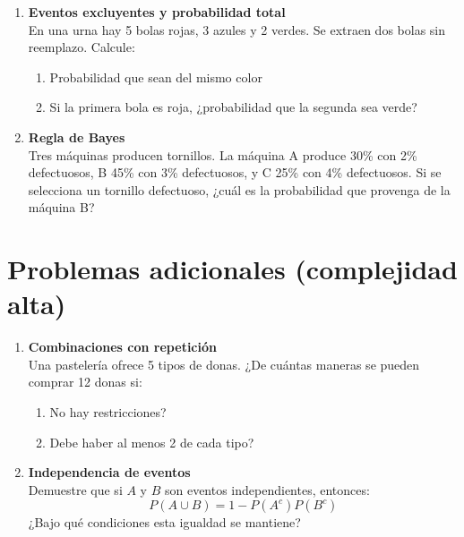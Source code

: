 \documentclass[letterpaper]{article}
\begin{document}
\begin{enumerate}
		\item \textbf{Eventos excluyentes y probabilidad total}\\
		En una urna hay 5 bolas rojas, 3 azules y 2 verdes. Se extraen dos bolas sin reemplazo. Calcule:
		\begin{enumerate}
			\item Probabilidad que sean del mismo color
			\item Si la primera bola es roja, ¿probabilidad que la segunda sea verde?
		\end{enumerate}
		
		\item \textbf{Regla de Bayes}\\
		Tres máquinas producen tornillos. La máquina A produce 30\% con 2\% defectuosos, B 45\% con 3\% defectuosos, y C 25\% con 4\% defectuosos. Si se selecciona un tornillo defectuoso, ¿cuál es la probabilidad que provenga de la máquina B?
		
	\end{enumerate}
	
	\section*{Problemas adicionales (complejidad alta)}
	\begin{enumerate}
		\addtocounter{enumi}{10}
		
		\item \textbf{Combinaciones con repetición}\\
		Una pastelería ofrece 5 tipos de donas. ¿De cuántas maneras se pueden comprar 12 donas si:
		\begin{enumerate}
			\item No hay restricciones?
			\item Debe haber al menos 2 de cada tipo?
		\end{enumerate}
		
		\item \textbf{Independencia de eventos}\\
		Demuestre que si $A$ y $B$ son eventos independientes, entonces:
		\[
		P(A \cup B) = 1 - P(A^c)P(B^c)
		\]
		¿Bajo qué condiciones esta igualdad se mantiene?
		
	\end{enumerate}
	
\end{document}
